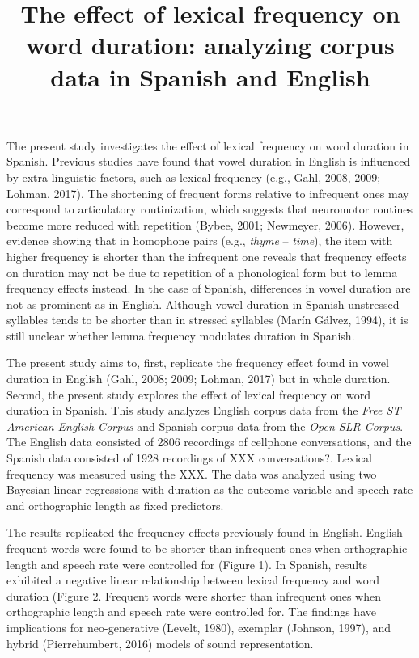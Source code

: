 \documentclass[
  12pt,
]{article}
\title{The effect of lexical frequency on word duration: analyzing
corpus data in Spanish and English}
\author{}
\date{\vspace{-2.5em}}
\begin{document}
\maketitle

The present study investigates the effect of lexical frequency on word
duration in Spanish. Previous studies have found that vowel duration in
English is influenced by extra-linguistic factors, such as lexical
frequency (e.g., Gahl, 2008, 2009; Lohman, 2017). The shortening of
frequent forms relative to infrequent ones may correspond to
articulatory routinization, which suggests that neuromotor routines
become more reduced with repetition (Bybee, 2001; Newmeyer, 2006).
However, evidence showing that in homophone pairs (e.g., \emph{thyme} --
\emph{time}), the item with higher frequency is shorter than the
infrequent one reveals that frequency effects on duration may not be due
to repetition of a phonological form but to lemma frequency effects
instead. In the case of Spanish, differences in vowel duration are not
as prominent as in English. Although vowel duration in Spanish
unstressed syllables tends to be shorter than in stressed syllables
(Marín Gálvez, 1994), it is still unclear whether lemma frequency
modulates duration in Spanish.

The present study aims to, first, replicate the frequency effect found
in vowel duration in English (Gahl, 2008; 2009; Lohman, 2017) but in
whole duration. Second, the present study explores the effect of lexical
frequency on word duration in Spanish. This study analyzes English
corpus data from the \emph{Free ST American English Corpus} and Spanish
corpus data from the \emph{Open SLR Corpus}. The English data consisted
of 2806 recordings of cellphone conversations, and the Spanish data
consisted of 1928 recordings of XXX conversations?. Lexical frequency
was measured using the XXX. The data was analyzed using two Bayesian
linear regressions with duration as the outcome variable and speech rate
and orthographic length as fixed predictors.

The results replicated the frequency effects previously found in
English. English frequent words were found to be shorter than infrequent
ones when orthographic length and speech rate were controlled for
(Figure 1). In Spanish, results exhibited a negative linear relationship
between lexical frequency and word duration (Figure 2. Frequent words
were shorter than infrequent ones when orthographic length and speech
rate were controlled for. The findings have implications for
neo-generative (Levelt, 1980), exemplar (Johnson, 1997), and hybrid
(Pierrehumbert, 2016) models of sound representation.
\end{document}
